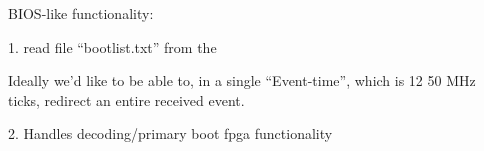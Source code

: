 BIOS-like functionality: 

1. read file ``bootlist.txt'' from the 

Ideally we'd like to be able to, in a single ``Event-time'', which is
12 50 MHz ticks, redirect an entire received event. 

2. Handles decoding/primary boot fpga functionality
